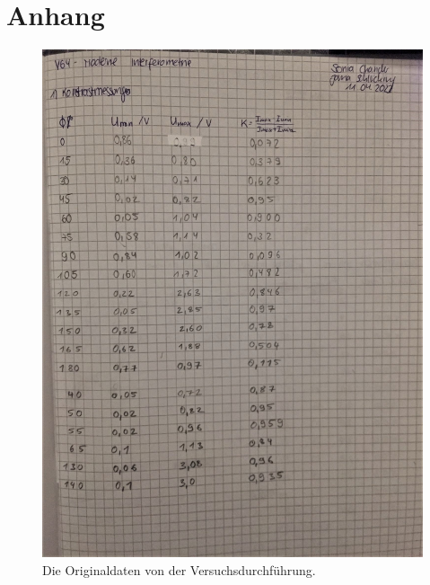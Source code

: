 \section{Anhang}
\label{sec:anhang}

\begin{figure}
    \centering
    \includegraphics[width=\textwidth]{bilder/Messwerte_Anhang1.jpeg}
    \caption{Die Originaldaten von der Versuchsdurchführung.}
    \label{fig:originaldaten1}
\end{figure}

